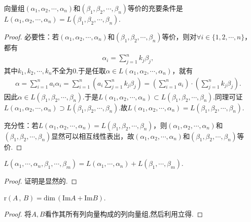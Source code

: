 \documentclass[../../main.tex]{subfiles}%
\begin{document}
\begin{proposition}\label{proposition:等价向量组张成的子空间相同}
向量组$(\alpha_1,\alpha_2,\cdots,\alpha_n)$和$(\beta_1,\beta_2,\cdots,\beta_n)$等价的充要条件是$L(\alpha_1,\alpha_2,\cdots,\alpha_n) = L(\beta_1,\beta_2,\cdots,\beta_n)$.
\end{proposition}
\begin{proof}
必要性：若$(\alpha _1,\alpha _2,\cdots ,\alpha _n)$和$(\beta _1,\beta _2,\cdots ,\beta _n)$等价，则对$\forall i\in \{ 1,2,\cdots ,n \}$，都有
\begin{align*}
\alpha _i=\sum_{j=1}^n{k_j\beta _j},
\end{align*}
其中$k_1,k_2,\cdots ,k_n$不全为$0$.于是任取$\alpha \in L(\alpha _1,\alpha _2,\cdots ,\alpha _n)$，就有
\begin{align*}
\alpha =\sum_{i=1}^n{a_i\alpha _i}=\sum_{i=1}^n{\left( a_i\sum_{j=1}^n{k_j\beta _j} \right)}=\left( \sum_{i=1}^n{a_i} \right) \cdot \left( \sum_{j=1}^n{k_j\beta _j} \right) .
\end{align*}
因此$\alpha \in L(\beta _1,\beta _2,\cdots ,\beta _n)$.于是$L(\alpha _1,\alpha _2,\cdots ,\alpha _n) \subset L(\beta _1,\beta _2,\cdots ,\beta _n)$.同理可证$L(\alpha _1,\alpha _2,\cdots ,\alpha _n) \supset L(\beta _1,\beta _2,\cdots ,\beta _n)$.故$L(\alpha _1,\alpha _2,\cdots ,\alpha _n) =L(\beta _1,\beta _2,\cdots ,\beta _n)$.

充分性：若$L(\alpha _1,\alpha _2,\cdots ,\alpha _n) =L(\beta _1,\beta _2,\cdots ,\beta _n)$，则$(\alpha _1,\alpha _2,\cdots ,\alpha _n)$和$(\beta _1,\beta _2,\cdots ,\beta _n)$显然可以相互线性表出，故$(\alpha _1,\alpha _2,\cdots ,\alpha _n)$和$(\beta _1,\beta _2,\cdots ,\beta _n)$等价.
\end{proof}

\begin{proposition}\label{proposition:命题31654668486}
$L\left( \alpha _1,\cdots ,\alpha _n,\beta _1,\cdots ,\beta _m \right) =L\left( \alpha _1,\cdots ,\alpha _n \right) +L\left( \beta _1,\cdots ,\beta _m \right) .$
\end{proposition}
\begin{proof}
证明是显然的.
\end{proof}

\begin{corollary}\label{corollary:推论rA,,B=dimImA+ImB}
$\mathrm{r}\left( A\,,\,B \right) =\mathrm{dim}\,\left( \mathrm{Im}A+\mathrm{Im}B \right) .$
\end{corollary}
\begin{proof}
将$A,B$看作其所有列向量构成的列向量组,然后利用立得.
\end{proof}
\end{document}
